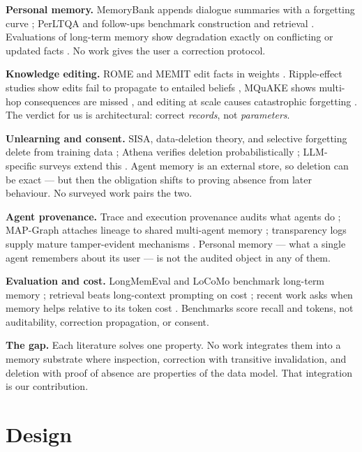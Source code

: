 \documentclass[11pt]{article}
\begin{document}
\textbf{Personal memory.} MemoryBank appends dialogue summaries with a forgetting curve \cite{memorybank}; PerLTQA and follow-ups benchmark construction and retrieval \cite{perltqa,memconstruct,simplebaseline}. Evaluations of long-term memory show degradation exactly on conflicting or updated facts \cite{longtermeval}. No work gives the user a correction protocol.

\textbf{Knowledge editing.} ROME and MEMIT edit facts in weights \cite{rome,memit,decao,kesurvey}. Ripple-effect studies show edits fail to propagate to entailed beliefs \cite{ripple}, MQuAKE shows multi-hop consequences are missed \cite{mquake}, and editing at scale causes catastrophic forgetting \cite{editatscale}. The verdict for us is architectural: correct \emph{records}, not \emph{parameters}.

\textbf{Unlearning and consent.} SISA, data-deletion theory, and selective forgetting delete from training data \cite{ginart,sisa,eternal}; Athena verifies deletion probabilistically \cite{athena}; LLM-specific surveys extend this \cite{frontier,whatforget}. Agent memory is an external store, so deletion can be exact --- but then the obligation shifts to proving absence from later behaviour. No surveyed work pairs the two.

\textbf{Agent provenance.} Trace and execution provenance audits what agents do \cite{agenttrace}; MAP-Graph attaches lineage to shared multi-agent memory \cite{mapgraph}; transparency logs supply mature tamper-evident mechanisms \cite{transplogs}. Personal memory --- what a single agent remembers about its user --- is not the audited object in any of them.

\textbf{Evaluation and cost.} LongMemEval and LoCoMo benchmark long-term memory \cite{longmemeval,locomo}; retrieval beats long-context prompting on cost \cite{ragvslc,lostmiddle,compressctx}; recent work asks when memory helps relative to its token cost \cite{costaware,recallforget,agentmembench}. Benchmarks score recall and tokens, not auditability, correction propagation, or consent.

\textbf{The gap.} Each literature solves one property. No work integrates them into a memory substrate where inspection, correction with transitive invalidation, and deletion with proof of absence are properties of the data model. That integration is our contribution.

\section{Design}
\label{sec:design}
\end{document}
